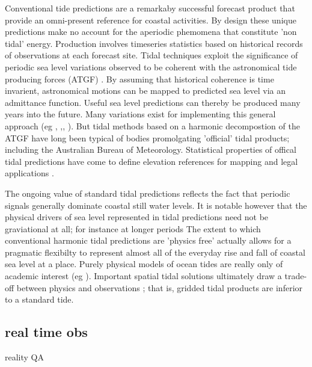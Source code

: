 Conventional tide predictions are a remarkaby successful forecast product that provide an omni-present reference for coastal activities.
By design these unique predictions make no account for the aperiodic phemomena that constitute 'non tidal' energy. 
Production involves timeseries statistics based on historical records of observations at each forecast site.
Tidal techniques exploit the significance of periodic sea level variations observed to be coherent with the astronomical tide producing forces (ATGF) \cite{Hendershott:1981ub}.     
By assuming that historical coherence is time invarient, astronomical motions can be mapped to predicted sea level via an admittance function.   
Useful sea level predictions can thereby be produced many years into the future.  
Many variations exist for implementing this general approach (eg \cite{Foreman:2009bg}, \cite{Groves:1975ky},\cite{LEFFLER:2009ej},\cite{Smith:1997ut} ). 
But tidal methods based on a harmonic decompostion of the ATGF have long been typical of bodies promolgating 'official' tidal products; including the Australian Bureau of Meteorology.
Statistical properties of offical tidal predictions have come to define elevation references for mapping and legal applications \cite{PCTMSL:2009vy}.


The ongoing value of standard tidal predictions reflects the fact that periodic signals generally dominate coastal still water levels.
It is notable however that the physical drivers of sea level represented in tidal predictions need not be graviational at all; for instance at longer periods \cite{Parker:2007wq}
The extent to which conventional harmonic tidal predictions are 'physics free' actually allows for a pragmatic flexibilty to represent almost all of the everyday rise and fall of coastal sea level at a place.
Purely physical models of ocean tides are really only of academic interest (eg \cite{Weis:2008ex} \cite{Muller:2008hs}).
Important spatial tidal solutions ultimately draw a trade-off between physics and observations \cite{Egbert:1996vr}; that is, gridded tidal products are inferior to a standard tide.



\subsection{real time obs}
 reality
 QA
 
